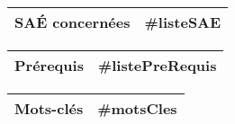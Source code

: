\begin{tabular}[t]{|P|T|}
\hline
    \textcolor{ressourceC}{\bfseries SAÉ concernées }
    &
    #listeSAE %
    \\
\hline
\end{tabular}

\begin{tabular}[t]{|P|T|}
\hline
    \textcolor{ressourceC}{\bfseries Prérequis}
    &
    #listePreRequis %
    \\
\hline
\end{tabular}

\begin{tabular}[t]{|P|T|}
\hline
    \textcolor{ressourceC}{\bfseries Mots-clés}
    &
    #motsCles %
    \\
\hline

\end{tabular}

